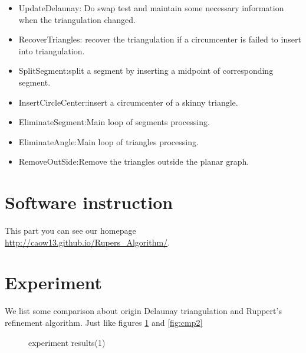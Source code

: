 \documentclass[letterpaper,12pt]{article}
\begin{document}
\begin{itemize}
\begin{itemize}
\item UpdateDelaunay: Do swap test and maintain some necessary information when the
triangulation changed.  
\item RecoverTriangles: recover the triangulation if a circumcenter is
failed to insert into triangulation.  
\item SplitSegment:split a segment by inserting a midpoint of corresponding segment.  
\item InsertCircleCenter:insert a circumcenter of a skinny triangle.  
\item EliminateSegment:Main loop of segments processing.  
\item EliminateAngle:Main loop of triangles processing.  
\item RemoveOutSide:Remove the triangles outside the planar graph.
\end{itemize}

\end{itemize}
\section{Software instruction}
\label{sec:03}
This part you can see our homepage \url{http://caow13.github.io/Rupers_Algorithm/}. 

\section{Experiment}
\label{sec:04}
We list some comparison about origin Delaunay triangulation and Ruppert's refinement algorithm. Just
like figures \ref{fig:cmp1} and \ref{fig:cmp2}

\begin{figure}[!htb]
  \centering
  





  \caption{experiment results(1)}
  \label{fig:cmp1}
\end{figure}
\end{document}
